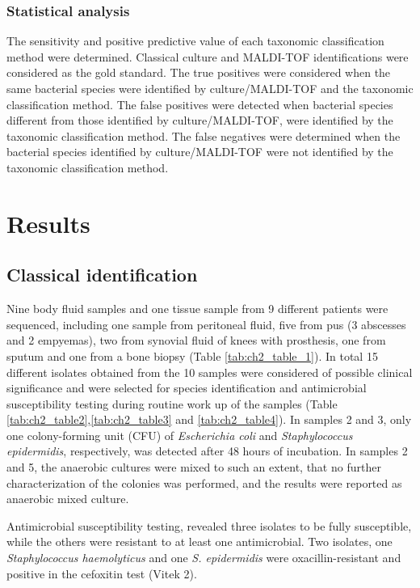 \subsubsection{Statistical analysis}

The sensitivity and positive predictive value of each taxonomic classification method were determined. 
Classical culture and MALDI-TOF identifications were considered as the gold standard. 
The true positives were considered when the same bacterial species were identified by culture/MALDI-TOF and the taxonomic classification method. 
The false positives were detected when bacterial species different from those identified by culture/MALDI-TOF, were identified by the taxonomic classification method. 
The false negatives were determined when the bacterial species identified by culture/MALDI-TOF were not identified by the taxonomic classification method.

\section{Results} \label{sec:ch2_results}

\subsection{Classical identification}

Nine body fluid samples and one tissue sample from 9 different patients were sequenced, including one sample from peritoneal fluid, five from pus (3 abscesses and 2 empyemas), two from synovial fluid of knees with prosthesis, one from sputum and one from a bone biopsy (Table \ref{tab:ch2_table_1}).
In total 15 different isolates obtained from the 10 samples were considered of possible clinical significance and were selected for species identification and antimicrobial susceptibility testing during routine work up of the samples (Table \ref{tab:ch2_table2},\ref{tab:ch2_table3} and \ref{tab:ch2_table4}).
In samples 2 and 3, only one colony-forming unit (CFU) of \textit{Escherichia coli} and \textit{Staphylococcus epidermidis}, respectively, was detected after 48 hours of incubation. 
In samples 2 and 5, the anaerobic cultures were mixed to such an extent, that no further characterization of the colonies was performed, and the results were reported as anaerobic mixed culture.

Antimicrobial susceptibility testing, revealed three isolates to be fully susceptible, while the others were resistant to at least one antimicrobial. 
Two isolates, one \textit{Staphylococcus haemolyticus} and one \textit{S. epidermidis} were oxacillin-resistant and positive in the cefoxitin test (Vitek 2).

